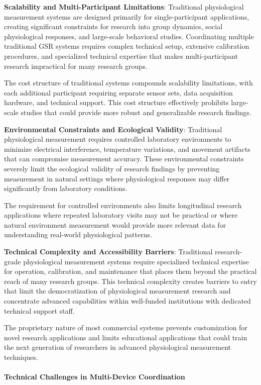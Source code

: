 \documentclass[12pt,a4paper]{report}
\begin{document}
\textbf{Scalability and Multi-Participant Limitations}: Traditional physiological measurement systems are designed primarily
for single-participant applications, creating significant constraints for research into group dynamics, social
physiological responses, and large-scale behavioral studies. Coordinating multiple traditional GSR systems requires
complex technical setup, extensive calibration procedures, and specialized technical expertise that makes
multi-participant research impractical for many research groups.

The cost structure of traditional systems compounds scalability limitations, with each additional participant requiring
separate sensor sets, data acquisition hardware, and technical support. This cost structure effectively prohibits
large-scale studies that could provide more robust and generalizable research findings.

\textbf{Environmental Constraints and Ecological Validity}: Traditional physiological measurement requires controlled
laboratory environments to minimize electrical interference, temperature variations, and movement artifacts that can
compromise measurement accuracy. These environmental constraints severely limit the ecological validity of research
findings by preventing measurement in natural settings where physiological responses may differ significantly from
laboratory conditions.

The requirement for controlled environments also limits longitudinal research applications where repeated laboratory
visits may not be practical or where natural environment measurement would provide more relevant data for understanding
real-world physiological patterns.

\textbf{Technical Complexity and Accessibility Barriers}: Traditional research-grade physiological measurement systems
require specialized technical expertise for operation, calibration, and maintenance that places them beyond the
practical reach of many research groups. This technical complexity creates barriers to entry that limit the
democratization of physiological measurement research and concentrate advanced capabilities within well-funded
institutions with dedicated technical support staff.

The proprietary nature of most commercial systems prevents customization for novel research applications and limits
educational applications that could train the next generation of researchers in advanced physiological measurement
techniques.

\paragraph{Technical Challenges in Multi-Device Coordination}
\end{document}
